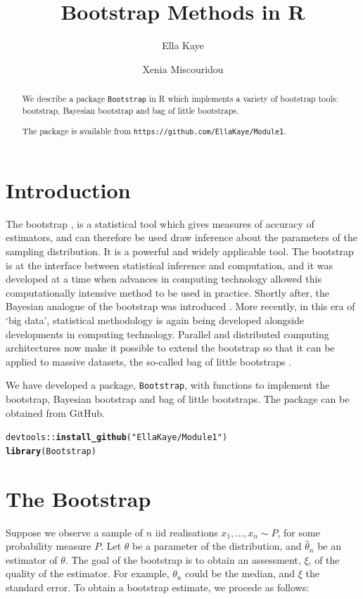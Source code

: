 \documentclass{article}\usepackage[]{graphicx}\usepackage[]{color}
\title{Bootstrap Methods in R}
\author{Ella Kaye \and Xenia Miscouridou}
\makeatletter
\newcommand{\hlstr}[1]{\textcolor[rgb]{0.192,0.494,0.8}{#1}}%
\newcommand{\hlopt}[1]{\textcolor[rgb]{0,0,0}{#1}}%
\newcommand{\hlstd}[1]{\textcolor[rgb]{0.345,0.345,0.345}{#1}}%
\newcommand{\hlkwd}[1]{\textcolor[rgb]{0.737,0.353,0.396}{\textbf{#1}}}%
\newenvironment{kframe}{%
 \def\at@end@of@kframe{}%
 \ifinner\ifhmode%
  \def\at@end@of@kframe{\end{minipage}}%
  \begin{minipage}{\columnwidth}%
 \fi\fi%
 \def\FrameCommand##1{\hskip\@totalleftmargin \hskip-\fboxsep
 \colorbox{shadecolor}{##1}\hskip-\fboxsep
     \hskip-\linewidth \hskip-\@totalleftmargin \hskip\columnwidth}%
 \MakeFramed {\advance\hsize-\width
   \@totalleftmargin\z@ \linewidth\hsize
   \@setminipage}}%
 {\par\unskip\endMakeFramed%
 \at@end@of@kframe}
\newenvironment{knitrout}{}{} %
\makeatother
\begin{document}
\maketitle

\begin{abstract}
We describe a package \texttt{Bootstrap} in R which implements a variety of bootstrap tools: bootstrap, Bayesian bootstrap and bag of little bootstraps.

The package is available from \texttt{https://github.com/EllaKaye/Module1}.
\end{abstract}

\section{Introduction}
The bootstrap \parencite{Efron1979}, is a statistical tool which gives measures of accuracy of estimators, and can therefore be used draw inference about the parameters of the sampling distribution. It is a powerful and widely applicable tool. The bootstrap is at the interface between statistical inference and computation, and it was developed at a time when advances in computing technology allowed this computationally intensive method to be used in practice. Shortly after, the Bayesian analogue of the bootstrap was introduced \parencite{Rubin1981}. More recently, in this era of `big data', statistical methodology is again being developed alongside developments in computing technology. Parallel and distributed computing architectures now make it possible to extend the bootstrap so that it can be applied to massive datasets, the so-called bag of little bootstraps \parencite{Kleiner2014}.

We have developed a package, \texttt{Bootstrap}, with functions to implement the bootstrap, Bayesian bootstrap and bag of little bootstraps. The package can be obtained from GitHub.
\begin{knitrout}
\color{fgcolor}\begin{kframe}
\begin{alltt}
\hlstd{devtools}\hlopt{::}\hlkwd{install_github}\hlstd{(}\hlstr{"EllaKaye/Module1"}\hlstd{)}
\hlkwd{library}\hlstd{(Bootstrap)}
\end{alltt}
\end{kframe}
\end{knitrout}




\section{The Bootstrap}
Suppose we observe a sample of $n$ iid realisations  $x_1,\ldots, x_n \sim P$, for some probability measure $P$. Let $\theta$ be a parameter of the distribution, and $\hat\theta_n$ be an estimator of $\theta$. The goal of the bootstrap is to obtain an assessment, $\xi$, of the quality of the estimator. For example, $\theta_n$ could be the median, and $\xi$ the standard error. To obtain a bootstrap estimate, we procede as follows:
\end{document}
